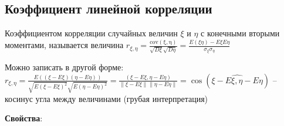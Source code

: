 \subsection{Коэффициент линейной корреляции}

\hypertarget{correlation}{}

\Def Коэффициентом корреляции случайных величин $\xi$ и $\eta$ с конечными вторыми моментами,
называется величина $r_{\xi,\eta} = \frac{\mathrm{cov(\xi, \eta)}}{\sqrt{D\xi} \sqrt{D\eta}} = \frac{E(\xi\eta) - E\xi E\eta}{\sigma_\xi \sigma_\eta}$

Можно записать в другой форме: $r_{\xi,\eta} = \frac{E((\xi - E\xi)(\eta - E\eta))}{\sqrt{E(\xi - E\xi)^2}\sqrt{E(\eta - E\eta)^2}} = 
\frac{(\xi - E\xi, \eta - E\eta)}{\|\xi - E\xi\|\|\eta - E\eta\|} = \cos(\widehat{\xi - E\xi, \eta - E\eta})$ -- косинус угла между величинами (грубая интерпретация)

\mediumvspace

\textbf{Свойства}:

